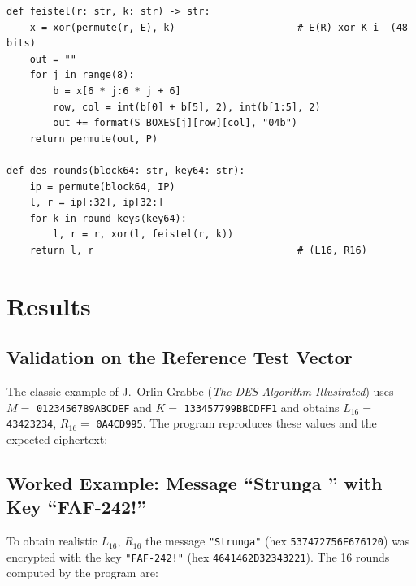 \documentclass[12pt,a4paper]{article}
\begin{document}
\begin{lstlisting}[style=py, caption={Full DES used for verification}]
def feistel(r: str, k: str) -> str:
    x = xor(permute(r, E), k)                     # E(R) xor K_i  (48 bits)
    out = ""
    for j in range(8):
        b = x[6 * j:6 * j + 6]
        row, col = int(b[0] + b[5], 2), int(b[1:5], 2)
        out += format(S_BOXES[j][row][col], "04b")
    return permute(out, P)

def des_rounds(block64: str, key64: str):
    ip = permute(block64, IP)
    l, r = ip[:32], ip[32:]
    for k in round_keys(key64):
        l, r = r, xor(l, feistel(r, k))
    return l, r                                   # (L16, R16)
\end{lstlisting}

\section{Results}
\subsection{Validation on the Reference Test Vector}
The classic example of J.\ Orlin Grabbe (\emph{The DES Algorithm Illustrated}) uses
$M=$ \texttt{0123456789ABCDEF} and $K=$ \texttt{133457799BBCDFF1} and obtains
$L_{16}=$ \texttt{43423234}, $R_{16}=$ \texttt{0A4CD995}. The program reproduces these values and
the expected ciphertext:
\begin{terminal}
\end{terminal}

\subsection{Worked Example: Message ``Strunga '' with Key ``FAF-242!''}
To obtain realistic $L_{16}$, $R_{16}$ the message \texttt{"Strunga\textvisiblespace"}
(hex \texttt{537472756E676120}) was encrypted with the key \texttt{"FAF-242!"}
(hex \texttt{4641462D32343221}). The 16 rounds computed by the program are:
\end{document}
